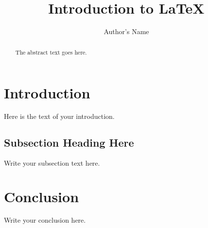 \documentclass{article}
\begin{document}
\title{Introduction to \LaTeX{}}
\author{Author's Name}

\maketitle

\begin{abstract}
The abstract text goes here.
\end{abstract}

\section{Introduction}
Here is the text of your introduction.

\subsection{Subsection Heading Here}
Write your subsection text here.

\section{Conclusion}
Write your conclusion here.
\end{document}
